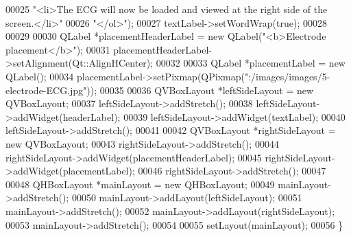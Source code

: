 \begin{DoxyCode}
00025                        \textcolor{stringliteral}{"<li>The ECG will now be loaded and viewed at the right side of the screen.</li>"}
00026                        \textcolor{stringliteral}{"</ol>"});
00027     textLabel->setWordWrap(\textcolor{keyword}{true});
00028 
00029 
00030     QLabel *placementHeaderLabel = \textcolor{keyword}{new} QLabel(\textcolor{stringliteral}{"<b>Electrode placement</b>"});
00031     placementHeaderLabel->setAlignment(Qt::AlignHCenter);
00032 
00033     QLabel *placementLabel = \textcolor{keyword}{new} QLabel();
00034     placementLabel->setPixmap(QPixmap(\textcolor{stringliteral}{":/images/images/5-electrode-ECG.jpg"}));
00035 
00036     QVBoxLayout *leftSideLayout = \textcolor{keyword}{new} QVBoxLayout;
00037     leftSideLayout->addStretch();
00038     leftSideLayout->addWidget(headerLabel);
00039     leftSideLayout->addWidget(textLabel);
00040     leftSideLayout->addStretch();
00041 
00042     QVBoxLayout *rightSideLayout = \textcolor{keyword}{new} QVBoxLayout;
00043     rightSideLayout->addStretch();
00044     rightSideLayout->addWidget(placementHeaderLabel);
00045     rightSideLayout->addWidget(placementLabel);
00046     rightSideLayout->addStretch();
00047 
00048     QHBoxLayout *mainLayout = \textcolor{keyword}{new} QHBoxLayout;
00049     mainLayout->addStretch();
00050     mainLayout->addLayout(leftSideLayout);
00051     mainLayout->addStretch();
00052     mainLayout->addLayout(rightSideLayout);
00053     mainLayout->addStretch();
00054 
00055     setLayout(mainLayout);
00056 \}
\end{DoxyCode}
